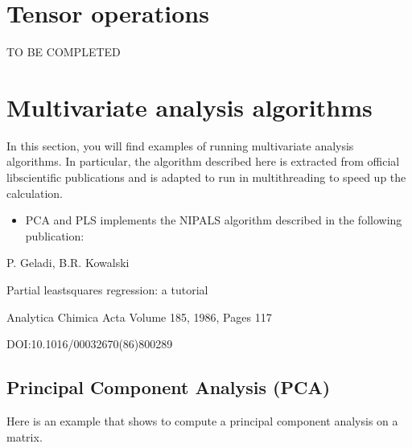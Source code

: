 \documentclass[letterpaper,10pt,english]{sphinxmanual}
\begin{document}
\chapter{Tensor operations}
\label{\detokenize{GettingStartedInPython:tensor-operations}}
\sphinxAtStartPar
TO BE COMPLETED


\chapter{Multivariate analysis algorithms}
\label{\detokenize{GettingStartedInPython:multivariate-analysis-algorithms}}
\sphinxAtStartPar
In this section, you will find examples of running multivariate analysis algorithms.
In particular, the algorithm described here is extracted from official libscientific publications and is adapted to run in multithreading to speed up the calculation.
\begin{itemize}
\item {} 
\sphinxAtStartPar
PCA and PLS implements the NIPALS algorithm described in the following publication:

\end{itemize}

\begin{DUlineblock}{0em}
\item[] P. Geladi, B.R. Kowalski
\item[] Partial least\sphinxhyphen{}squares regression: a tutorial
\item[] Analytica Chimica Acta Volume 185, 1986, Pages 1\textendash{}17
\item[] DOI:10.1016/0003\sphinxhyphen{}2670(86)80028\sphinxhyphen{}9
\end{DUlineblock}


\section{Principal Component Analysis (PCA)}
\label{\detokenize{GettingStartedInPython:principal-component-analysis-pca}}
\sphinxAtStartPar
Here is an example that shows to compute a principal component analysis on a matrix.
\end{document}
